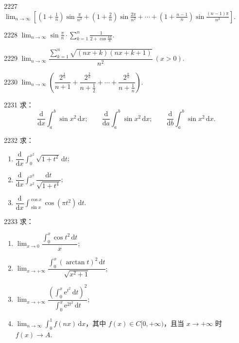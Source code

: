 
\begin{prob}[S]{2227}
$\displaystyle\lim_{n \to \infty} \left[\left(1 + \frac{1}{n}\right)\sin\frac{\pi}{n^2} + \left(1 + \frac{2}{n}\right)\sin\frac{2\pi}{n^2} + \cdots + \left(1 + \frac{n-1}{n}\right)\sin\frac{(n-1)\pi}{n^2}\right]$.
\end{prob}

\begin{prob}[S]{2228}
$\displaystyle\lim_{n \to \infty} \sin\frac{\pi}{n} \cdot \sum_{k=1}^{n} \frac{1}{2 + \cos\frac{k\pi}{n}}$.
\end{prob}

\begin{prob}[S]{2229}
$\lim_{n\to\infty} \dfrac{\sum\limits_{k=1}^{n} \sqrt{(nx+k)(nx+k+1)}}{n^2}\ (x > 0)$.
\end{prob}

\begin{prob}[S]{2230}
$\lim_{n\to\infty} \left( \dfrac{2^{\frac{1}{n}}}{n+1} + \dfrac{2^{\frac{2}{n}}}{n+\frac{1}{2}} + \cdots + \dfrac{2^{\frac{n}{n}}}{n+\frac{1}{n}} \right)$.
\end{prob}

\begin{prob}[M]{2231}
求：
\[ \frac{\mathrm{d}}{\mathrm{d}x} \int_a^b \sin x^2 \,\mathrm{d}x; \qquad \frac{\mathrm{d}}{\mathrm{d}a} \int_a^b \sin x^2 \,\mathrm{d}x; \qquad \frac{\mathrm{d}}{\mathrm{d}b} \int_a^b \sin x^2 \,\mathrm{d}x. \]
\end{prob}

\begin{prob}[L]{2232}
求：
\begin{enumerate}[label=(\alph*), itemsep=2pt, topsep=3pt]
  \item $\dfrac{\mathrm{d}}{\mathrm{d}x} \int_0^{x^2} \sqrt{1+t^2}\,\mathrm{d}t$;
  \item $\dfrac{\mathrm{d}}{\mathrm{d}x} \int_{x^2}^{x^3} \dfrac{\mathrm{d}t}{\sqrt{1+t^4}}$;
  \item $\dfrac{\mathrm{d}}{\mathrm{d}x} \int_{\sin x}^{\cos x} \cos(\pi t^2)\,\mathrm{d}t$.
\end{enumerate}
\end{prob}

\begin{prob}[L]{2233}
求：
\begin{enumerate}[label=(\alph*), itemsep=2pt, topsep=3pt]
  \item $\lim_{x\to 0} \dfrac{\int_0^x \cos t^2 \,\mathrm{d}t}{x}$;
  \item $\lim_{x\to +\infty} \dfrac{\int_0^x (\arctan t)^2 \,\mathrm{d}t}{\sqrt{x^2+1}}$;
  \item $\lim_{x\to +\infty} \dfrac{\left(\int_0^x \mathrm{e}^{t^2}\,\mathrm{d}t\right)^2}{\int_0^x \mathrm{e}^{2t^2}\,\mathrm{d}t}$;
  \item $\lim_{n\to\infty} \int_0^1 f(nx)\,\mathrm{d}x$，其中 $f(x) \in C[0,+\infty)$，且当 $x\to +\infty$ 时 $f(x) \to A$.
\end{enumerate}
\end{prob}

